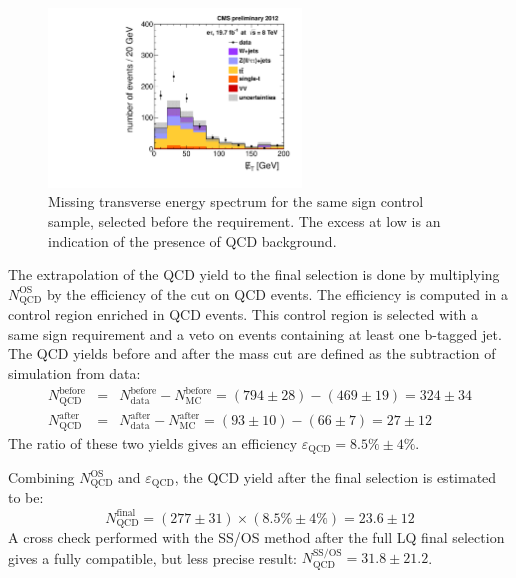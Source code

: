 \begin{figure}[htbp]
  \begin{center}
    \includegraphics[width=0.6\textwidth]{figures/etau/metPtSSIso.pdf}
    \caption{Missing transverse energy spectrum for the same sign control sample, selected before the \MassTJ requirement. The excess at low \met is an indication of the presence of QCD background.}
    \label{fig:QCDSSMET}
  \end{center}
\end{figure}


The extrapolation of the QCD yield to the final selection is done by multiplying $N_{\text{QCD}}^{\text{OS}}$ by the efficiency of the \MassTJ cut on QCD events.
The efficiency is computed in a control region enriched in QCD events. This control region is selected with a same sign requirement and a veto on events containing at least one b-tagged jet. The QCD yields before and after the mass cut are defined as the subtraction of simulation from data:
\begin{eqnarray}
N_{\text{QCD}}^{\text{before}} & = & N_{\text{data}}^{\text{before}} - N_{\text{MC}}^{\text{before}} = (794\pm 28) - (469\pm 19) = 324\pm 34 \\
N_{\text{QCD}}^{\text{after}} & = & N_{\text{data}}^{\text{after}} - N_{\text{MC}}^{\text{after}} = (93\pm 10) - (66\pm 7) = 27\pm 12
\end{eqnarray}
The ratio of these two yields gives an efficiency $\varepsilon_{\text{QCD}} = 8.5\% \pm 4\%$.

Combining $N_{\text{QCD}}^{\text{OS}}$ and $\varepsilon_{\text{QCD}}$, the QCD yield after the final selection is estimated to be:
\begin{equation}
N_{\text{QCD}}^{\text{final}} = (277\pm 31) \times (8.5\% \pm 4\%) = 23.6 \pm 12 
\end{equation}
A cross check performed with the SS/OS method after the full LQ final selection gives a fully compatible, but less precise result: $N_{\text{QCD}}^{\text{SS/OS}} = 31.8 \pm 21.2$.

